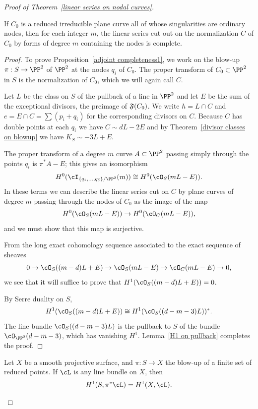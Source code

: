 \begin{proof}[Proof of Theorem~\ref{linear series on nodal curves}]
\begin{proposition}\label{adjoint completeness1}
If $C_{0}$ is a reduced irreducible plane curve all of whose singularities are ordinary nodes, then for each
integer $m$,
the linear series cut out on the normalization $C$ of $C_{0}$ by forms of degree $m$ containing the nodes
is complete.
\end{proposition}

\begin{proof}
To prove Proposition~\ref{adjoint completeness1}, we work on the blow-up $\pi : S \to \PP^2$ of $\PP^2$ at the nodes $q_i$ of $C_0$. The proper transform of $C_0 \subset \PP^2$ in $S$ is the normalization of $C_0$, which we will again call $C$.

Let $L$ be the class on $S$ of the pullback of a line in $\PP^2$  and let $E$ be the sum of the exceptional divisors, the preimage of $\adj(C_{0})$. We write $h= L\cap C$ and $e = E\cap C= \sum (p_i+q_i)$ for the corresponding divisors on $C$. 
Because $C$ has double points at each $q_{i}$ we have
$
C \sim dL - 2E 
$
and   by
Theorem~\ref{divisor classes on blowup} we have $K_S \sim -3L + E$.

The proper transform of a degree $m$ curve $A\subset \PP^2$  passing simply through the points $q_i$
is $\pi^*A - E$; this gives an isomorphism
$$
H^0(\cI_{\{q_1,\dots,q_\delta\}/\PP^2}(m)) \cong H^0(\cO_S(mL-E)).
$$
In these terms we can describe the linear series cut on $C$ by plane curves of degree $m$ passing through the nodes of $C_0$ as the image of the map
$$
H^0(\cO_S(mL-E)) \to H^0(\cO_C(mL-E)),
$$
and we must show that this map is surjective.

From the long exact cohomology sequence associated to the exact sequence of sheaves
$$
0 \to \cO_S((m-d)L + E)  \to \cO_S(mL-E) \to \cO_C(mL-E) \to 0,
$$
 we see that it will suffice to prove that $H^1(\cO_S((m-d)L + E)) = 0$. 
 
By Serre duality on $S$,
$$
H^1(\cO_S((m-d)L + E)) \cong H^1(\cO_S((d-m-3)L))^*.
$$
The line bundle $\cO_S((d-m-3)L)$ is 
 the pullback to $S$ of the bundle $\cO_{\PP^2}(d-m-3)$, which has vanishing $H^1$. Lemma~\ref{H1 on pullback} completes the proof.
\end{proof}

\begin{lemma}\label{H1 on pullback}
Let $X$ be a smooth projective surface, and $\pi : S \to X$ the blow-up of a finite set of reduced points. If $\cL$ is any line bundle on $X$, then
$$
H^1(S, \pi^*\cL) = H^1(X, \cL).
$$
\end{lemma}


\end{proof}
